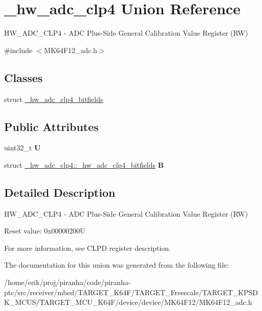 \hypertarget{union__hw__adc__clp4}{}\section{\+\_\+hw\+\_\+adc\+\_\+clp4 Union Reference}
\label{union__hw__adc__clp4}


H\+W\+\_\+\+A\+D\+C\+\_\+\+C\+L\+P4 -\/ A\+DC Plus-\/\+Side General Calibration Value Register (RW)  




{\ttfamily \#include $<$M\+K64\+F12\+\_\+adc.\+h$>$}

\subsection*{Classes}
\begin{DoxyCompactItemize}
\item 
struct \hyperlink{struct__hw__adc__clp4_1_1__hw__adc__clp4__bitfields}{\+\_\+hw\+\_\+adc\+\_\+clp4\+\_\+bitfields}
\end{DoxyCompactItemize}
\subsection*{Public Attributes}
\begin{DoxyCompactItemize}
\item 
uint32\+\_\+t {\bfseries U}\hypertarget{union__hw__adc__clp4_ae2f88e6a2df5193ef6f47e5fa83e927e}{}\label{union__hw__adc__clp4_ae2f88e6a2df5193ef6f47e5fa83e927e}

\item 
struct \hyperlink{struct__hw__adc__clp4_1_1__hw__adc__clp4__bitfields}{\+\_\+hw\+\_\+adc\+\_\+clp4\+::\+\_\+hw\+\_\+adc\+\_\+clp4\+\_\+bitfields} {\bfseries B}\hypertarget{union__hw__adc__clp4_a048283d403d8656d9aa9a9de3494eabf}{}\label{union__hw__adc__clp4_a048283d403d8656d9aa9a9de3494eabf}

\end{DoxyCompactItemize}


\subsection{Detailed Description}
H\+W\+\_\+\+A\+D\+C\+\_\+\+C\+L\+P4 -\/ A\+DC Plus-\/\+Side General Calibration Value Register (RW) 

Reset value\+: 0x00000200U

For more information, see C\+L\+PD register description. 

The documentation for this union was generated from the following file\+:\begin{DoxyCompactItemize}
\item 
/home/erik/proj/piranha/code/piranha-\/ptc/src/receiver/mbed/\+T\+A\+R\+G\+E\+T\+\_\+\+K64\+F/\+T\+A\+R\+G\+E\+T\+\_\+\+Freescale/\+T\+A\+R\+G\+E\+T\+\_\+\+K\+P\+S\+D\+K\+\_\+\+M\+C\+U\+S/\+T\+A\+R\+G\+E\+T\+\_\+\+M\+C\+U\+\_\+\+K64\+F/device/device/\+M\+K64\+F12/M\+K64\+F12\+\_\+adc.\+h\end{DoxyCompactItemize}

